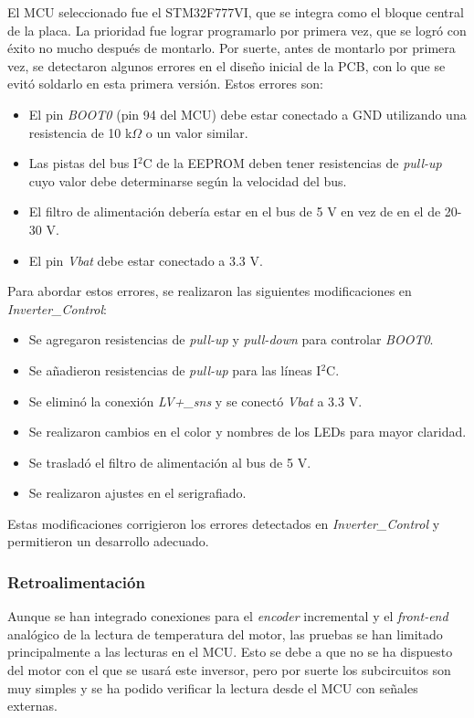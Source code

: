 El MCU seleccionado fue el STM32F777VI, que se integra como el bloque central de la placa. La prioridad fue lograr programarlo por primera vez, que se logró con éxito no mucho después de montarlo. Por suerte, antes de montarlo por primera vez, se detectaron algunos errores en el diseño inicial de la PCB, con lo que se evitó soldarlo en esta primera versión. Estos errores son:
\begin{itemize}
	\item El pin \textit{BOOT0} (pin 94 del MCU) debe estar conectado a GND utilizando una resistencia de 10 k$\Omega$ o un valor similar.
	\item Las pistas del bus I$^2$C de la EEPROM deben tener resistencias de \textit{pull-up} cuyo valor debe determinarse según la velocidad del bus.
	\item El filtro de alimentación debería estar en el bus de 5 V en vez de en el de 20-30 V.
	\item El pin \textit{Vbat} debe estar conectado a 3.3 V.
\end{itemize}

Para abordar estos errores, se realizaron las siguientes modificaciones en \textit{Inverter\_Control}:

\begin{itemize}
	\item Se agregaron resistencias de \textit{pull-up} y \textit{pull-down} para controlar \textit{BOOT0}.
	\item Se añadieron resistencias de \textit{pull-up} para las líneas I$^2$C.
	\item Se eliminó la conexión \textit{LV+\_sns} y se conectó \textit{Vbat} a 3.3 V.
	\item Se realizaron cambios en el color y nombres de los LEDs para mayor claridad.
	\item Se trasladó el filtro de alimentación al bus de 5 V.
	\item Se realizaron ajustes en el serigrafiado.
\end{itemize}

Estas modificaciones corrigieron los errores detectados en \textit{Inverter\_Control} y permitieron un desarrollo adecuado.

\subsubsection{Retroalimentación}

Aunque se han integrado conexiones para el \textit{encoder} incremental y el \textit{front-end} analógico de la lectura de temperatura del motor, las pruebas se han limitado principalmente a las lecturas en el MCU. Esto se debe a que no se ha dispuesto del motor con el que se usará este inversor, pero por suerte los subcircuitos son muy simples y se ha podido verificar la lectura desde el MCU con señales externas.

